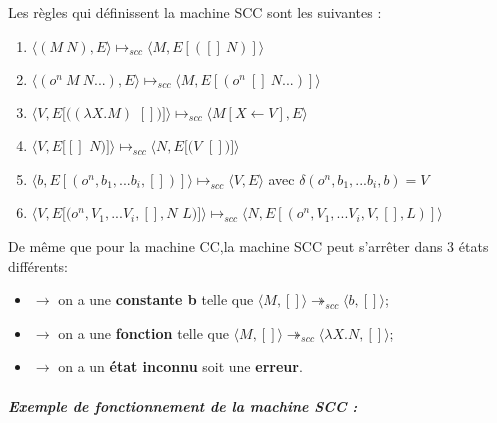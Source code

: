 \documentclass[10pt,a4paper]{article}
\begin{document}
				
				Les règles qui définissent la machine SCC sont les suivantes :
				
				\begin{enumerate}
					\item $\langle(M~N),E\rangle \longmapsto_{scc} \langle M,E[([]~N)]\rangle$
					
					\item $\langle(o^{n}~M~N...),E\rangle \longmapsto_{scc} \langle M,E[(o^{n}~[]~N...)]\rangle$
					
					\item $\langle V,E[((\lambda X.M)$ $[])]\rangle \longmapsto_{scc} \langle M[X\leftarrow V],E\rangle$
					
					\item $\langle V,E[[]$ $N)]\rangle \longmapsto_{scc} \langle N,E[(V$ $[])]\rangle$
					
					\item $\langle b,E[(o^{n},b_{1},...b_{i},[])]\rangle \longmapsto_{scc} \langle V,E\rangle$ avec $\delta
					 (o^{n},b_{1},...b_{i},b)=V$ 
					 
					\item $\langle V,E[(o^{n},V_{1},...V_{i},[],N$ $L)]\rangle \longmapsto_{scc} \langle N,E[(o^{n},V_{1},...V_{i},V,[],L)]\rangle$
				\end{enumerate}
				\bigbreak
				
			
				De même que pour la machine CC,la machine SCC peut s'arrêter dans 3 états différents:
				\begin{itemize}
					\item[]$\longrightarrow$ on a une \textbf{constante b} telle que $\langle M,[]\rangle \twoheadrightarrow_{scc} \langle b,[]\rangle$;
					\item[]$\longrightarrow$ on a une \textbf{fonction} telle que $\langle M,[]\rangle \twoheadrightarrow_{scc} \langle\lambda X.N,[]\rangle$;
					\item[]$\longrightarrow$ on a un \textbf{état inconnu} soit une \textbf{erreur}.
				\end{itemize}
				\newpage
				
				
				
				\subparagraph{Exemple de fonctionnement de la machine SCC :}
				
\end{document}
